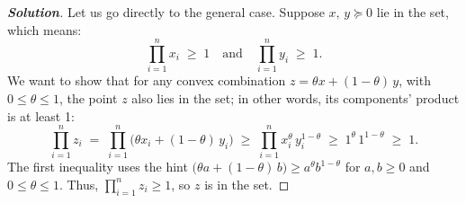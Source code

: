 \documentclass[12pt]{article}
\newenvironment{Solution}
  {\begin{proof}[\textbf{Solution}]}
  {\end{proof}}
\begin{document}
\begin{Solution}
	Let us go directly to the general case. Suppose \(x,\,y \succeq 0\) lie in the set, which means:
	\[
		\prod_{i=1}^n x_i \;\geq\; 1
		\quad\text{and}\quad
		\prod_{i=1}^n y_i \;\geq\; 1.
	\]
	We want to show that for any convex combination \(z = \theta x + (1-\theta)\,y\), with \(0 \leq \theta \leq 1\), the point \(z\) also lies in the set; in other words, its components’ product is at least 1:
	\[
		\prod_{i=1}^n z_i
		\;=\;
		\prod_{i=1}^n
		\bigl(\theta x_i + (1-\theta)\,y_i\bigr)
		\;\geq\;
		\prod_{i=1}^n x_i^{\theta}\,y_i^{1-\theta}
		\;\geq\;
		1^{\theta}\,1^{1-\theta}
		\;\geq\;
		1.
	\]
	The first inequality uses the hint
	\(\bigl(\theta a + (1-\theta)\,b\bigr) \geq a^{\theta} b^{1-\theta}\)
	for \(a,b \geq 0\) and \(0 \leq \theta \leq 1\).
	Thus, \(\prod_{i=1}^n z_i \geq 1\), so \(z\) is in the set.
\end{Solution}


\vspace{0.15in}
\end{document}
